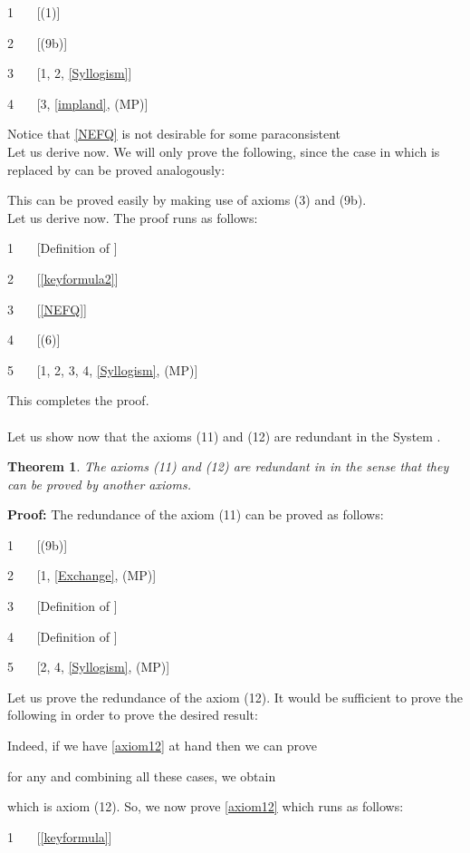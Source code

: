 \documentclass{llncs}
\newtheorem{theo}{Theorem}
\begin{document}
1 \ \ \  \hfill[(1)]

2 \ \ \ 
\hfill[(9b)]

3 \ \ \  \hfill[1, 2,
\eqref{Syllogism}]

4 \ \ \  \hfill[3,
\eqref{impland}, (MP)]

\noindent Notice that \eqref{NEFQ} is not desirable for some
paraconsistent\\
 Let us derive  now. We will only prove the following, since
the case in which  is replaced by  can be
proved analogously:

This can be proved easily by making use of axioms (3) and (9b).\\
Let us derive  now. The proof runs as follows:

1 \ \ \  \hfill[Definition of ]

2 \ \ \  \hfill[\eqref{keyformula2}]

3 \ \ \  \hfill[\eqref{NEFQ}]

4 \ \ \ 
\hfill[(6)]

5 \ \ \ 
\hfill[1, 2, 3, 4, \eqref{Syllogism}, (MP)]

\noindent This completes the proof.
\\\\
Let us  show now that the axioms (11) and (12) are redundant in the
System .
\begin{theo}\label{thm:axiom11redundant}
The axioms (11) and (12) are redundant in  in the sense that
they can be proved by another axioms.
\end{theo}
\textbf{Proof:} The redundance of the axiom (11) can be proved as
follows:

1 \ \ \  \hfill[(9b)]

2 \ \ \  \hfill[1, \eqref{Exchange}, (MP)]

3 \ \ \  \hfill[Definition of
]

4 \ \ \ 
\hfill[Definition of ]

5 \ \ \  \hfill[2, 4, \eqref{Syllogism}, (MP)]

\noindent Let us prove the redundance of the axiom (12).
 It would be sufficient to prove the following in
order to prove the desired result:

Indeed, if we have \eqref{axiom12} at hand then we can prove

for any  and combining all these cases, we obtain

which is axiom (12). So, we now prove \eqref{axiom12} which runs as
follows:

1 \ \ \  \hfill[\eqref{keyformula}]
\end{document}
